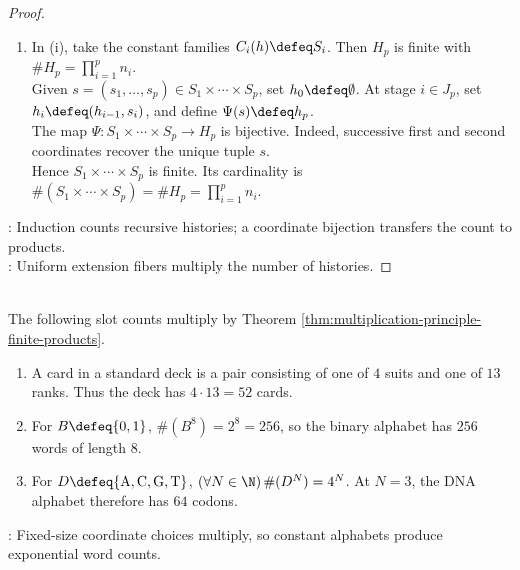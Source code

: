 \begin{theorem}
\begin{proof}
\begin{enumerate}[label=(\roman*)]
Consequently, $(\forall r\in\N)\,P_r$ by Theorem \ref{thm:mathematical-induction}; in particular, $P_p$ holds.
\item In (i), take the constant families $C_i(h)\defeq S_i$. Then $H_p$ is finite with $\#H_p=\prod\limits_{i=1}^{p}n_i$.\\
Given $s=(s_1,\ldots,s_p)\in S_1\times\cdots\times S_p$, set $h_0\defeq\emptyset$. At stage $i\in J_p$, set $h_i\defeq(h_{i-1},s_i)$, and define $\Psi(s)\defeq h_p$.\\
The map $\Psi:S_1\times\cdots\times S_p\to H_p$ is bijective. Indeed, successive first and second coordinates recover the unique tuple $s$.\\
Hence $S_1\times\cdots\times S_p$ is finite. Its cardinality is $\#(S_1\times\cdots\times S_p)=\#H_p=\prod\limits_{i=1}^{p}n_i$.
\end{enumerate}
: Induction counts recursive histories; a coordinate bijection transfers the count to products.\\
: Uniform extension fibers multiply the number of histories.
\end{proof}
\end{theorem}

\begin{example} \label{ex:cards-binary-and-dna-counting} \\
The following slot counts multiply by Theorem \ref{thm:multiplication-principle-finite-products}.
\begin{enumerate}[label=(\roman*)]
\setlength{\itemsep}{0pt}
\item A card in a standard deck is a pair consisting of one of $4$ suits and one of $13$ ranks. Thus the deck has $4\cdot13=52$ cards.
\item For $B\defeq\{0,1\}$, $\#(B^8)=2^8=256$, so the binary alphabet has $256$ words of length $8$.
\item For $D\defeq\{\mathrm{A},\mathrm{C},\mathrm{G},\mathrm{T}\}$, $(\forall N\in\N)\,\#(D^N)=4^N$. At $N=3$, the DNA alphabet therefore has $64$ codons.
\end{enumerate}
: Fixed-size coordinate choices multiply, so constant alphabets produce exponential word counts.
\end{example}
